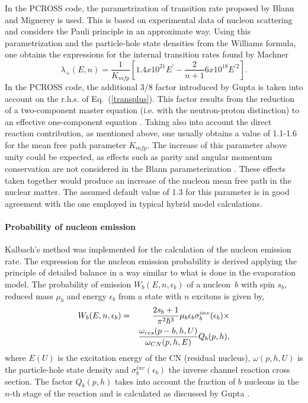 In the PCROSS code, the parametrization of transition rate proposed by
Blann and Mignerey \cite{Blann:72a} is used. This is based on experimental
data of nucleon scattering and considers the Pauli principle in an
approximate way. Using this parametrization and the
particle-hole state densities from the Williams formula, one obtains
the expressions for the internal transition rates found by Machner \cite%
{Machner:81}
\begin{equation}
\lambda _{+}(E,n)=\frac{1}{K_{mfp}}\left[ 1.4x10^{21}E^{\prime }-\frac{2}{n+1%
}6x10^{18}E^{\prime 2}\right].  \label{transplus}
\end{equation}%
In the PCROSS code, the additional 3/8 factor introduced by Gupta \cite%
{Gupta:81} is taken into account on the r.h.s. of Eq.~(\ref{transplus}).
This factor results from the reduction of a two-component master equation
(i.e. with the neutron-proton distinction) to an effective one-component
equation \cite{Gupta:81}. Taking also into account the direct reaction
contribution, as mentioned above, one usually obtains a value of
1.1-1.6 for the mean free path parameter $K_{mfp}$. The increase of this
parameter above unity could be expected, as effects such as parity and
angular momentum conservation are not considered in the Blann
parameterization \cite{Blann:72a}. These effects taken together would
produce an increase of the nucleon mean free path in the nuclear matter. The
assumed default value of 1.3 for this parameter is in good agreement with
the one employed in typical hybrid model calculations.

\paragraph{Probability of nucleon emission}

Kalbach's method \cite{Cline:71,Cline:72,Kalbach:77} was implemented
for the calculation of the nucleon emission rate. The expression for the
nucleon emission probability is derived applying the principle of detailed
balance in a way similar to what is done in the evaporation model. The
probability of emission $W_{b}(E,n,\epsilon _{b})$ of a nucleon\textit{\ }$b$
with spin $s_{b}$, reduced mass $\mu _{b}$ and energy $\epsilon _{b}$ from a
state with $n$ excitons is given by,
\begin{eqnarray}
W_{b}(E,n,\epsilon _{b})&=&\frac{2s_{b}+1}{\pi ^{2}\hbar ^{3}}\mu
_{b}\epsilon _{b}\sigma _{b}^{inv}(\epsilon _{b})\times  \notag \\
&&\frac{\omega _{res}(p-b,h,U)}{\omega _{CN}(p,h,E)}Q_{b}(p,h),
\end{eqnarray}%
where $E(U)$ is the excitation energy of the CN (residual nucleus), $\omega
(p,h,U)$ is the particle-hole state density and $\sigma _{b}^{inv}(\epsilon
_{b})$ the inverse channel reaction cross section. The factor $Q_{b}(p,h)$
takes into account the fraction of $b$ nucleons in the $n$-th stage of the
reaction and is calculated as discussed by Gupta \cite{Gupta:81}.

